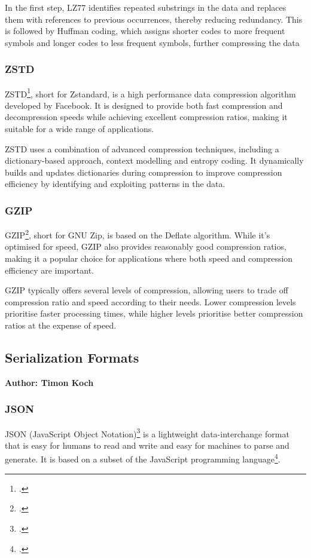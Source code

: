 In the first step, LZ77 identifies repeated substrings in the data and replaces them with references to previous occurrences, thereby reducing redundancy. This is followed by Huffman coding, which assigns shorter codes to more frequent symbols and longer codes to less frequent symbols, further compressing the data

\subsubsection{ZSTD}
ZSTD\footcite{zstd}, short for Zstandard, is a high performance data compression algorithm developed by Facebook. It is designed to provide both fast compression and decompression speeds while achieving excellent compression ratios, making it suitable for a wide range of applications.

ZSTD uses a combination of advanced compression techniques, including a dictionary-based approach, context modelling and entropy coding. It dynamically builds and updates dictionaries during compression to improve compression efficiency by identifying and exploiting patterns in the data.

\subsubsection{GZIP}
GZIP\footcite{gzip}, short for GNU Zip, is based on the Deflate algorithm. While it's optimised for speed, GZIP also provides reasonably good compression ratios, making it a popular choice for applications where both speed and compression efficiency are important.

GZIP typically offers several levels of compression, allowing users to trade off compression ratio and speed according to their needs. Lower compression levels prioritise faster processing times, while higher levels prioritise better compression ratios at the expense of speed.


\subsection{Serialization Formats}
\textbf{Author: Timon Koch}

\subsubsection{JSON}
JSON (JavaScript Object Notation)\footcite{json} is a lightweight data-interchange format that is easy for humans to read and write and easy for machines to parse and generate. It is based on a subset of the JavaScript programming language\footcite{javascript}.

